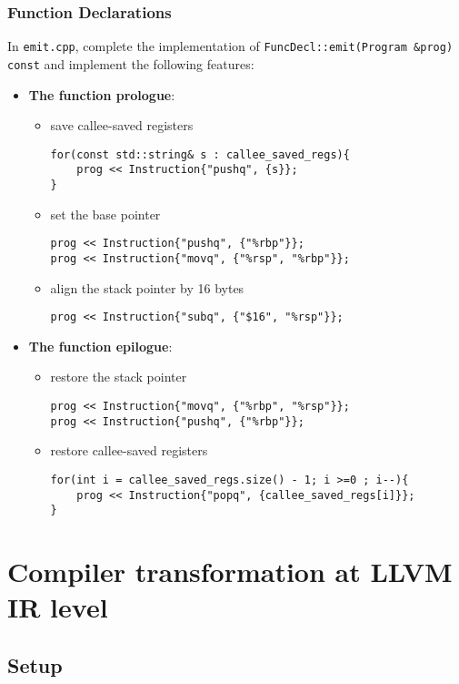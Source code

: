 \documentclass{report}
\begin{document}
	\subsection{Function Declarations}
	In \texttt{emit.cpp}, complete the implementation of \texttt{FuncDecl::emit(Program \&prog) const} and implement the following features:
	\begin{itemize}
		\item \textbf{The function prologue}:
		\begin{itemize}
			\item save callee-saved registers
			\begin{lstlisting}
for(const std::string& s : callee_saved_regs){
	prog << Instruction{"pushq", {s}};
}
			\end{lstlisting}
			\item set the base pointer
			\begin{lstlisting}
prog << Instruction{"pushq", {"%rbp"}};
prog << Instruction{"movq", {"%rsp", "%rbp"}};
			\end{lstlisting}
			\item align the stack pointer by 16 bytes
			\begin{lstlisting}
prog << Instruction{"subq", {"$16", "%rsp"}};
			\end{lstlisting}
		\end{itemize}
		\item \textbf{The function epilogue}:
		\begin{itemize}
			\item restore the stack pointer
			\begin{lstlisting}
prog << Instruction{"movq", {"%rbp", "%rsp"}};
prog << Instruction{"pushq", {"%rbp"}};
			\end{lstlisting}
			\item restore callee-saved registers
			\begin{lstlisting}
for(int i = callee_saved_regs.size() - 1; i >=0 ; i--){
	prog << Instruction{"popq", {callee_saved_regs[i]}};
}
			\end{lstlisting}
		\end{itemize}
	\end{itemize}
\chapter{Compiler transformation at LLVM IR level}	

\section{Setup}
\end{document}
